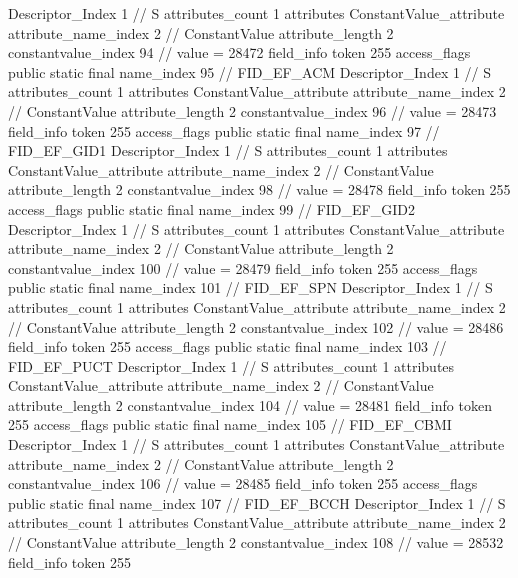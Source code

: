 {{{{{				Descriptor_Index	1		// S
				attributes_count	1
				attributes {
				ConstantValue_attribute {
					attribute_name_index	2		// ConstantValue
					attribute_length	2
					constantvalue_index	94		// value = 28472
				}
				}
			}
			field_info {
				token	255
				access_flags	public static final
				name_index	95		// FID_EF_ACM
				Descriptor_Index	1		// S
				attributes_count	1
				attributes {
				ConstantValue_attribute {
					attribute_name_index	2		// ConstantValue
					attribute_length	2
					constantvalue_index	96		// value = 28473
				}
				}
			}
			field_info {
				token	255
				access_flags	public static final
				name_index	97		// FID_EF_GID1
				Descriptor_Index	1		// S
				attributes_count	1
				attributes {
				ConstantValue_attribute {
					attribute_name_index	2		// ConstantValue
					attribute_length	2
					constantvalue_index	98		// value = 28478
				}
				}
			}
			field_info {
				token	255
				access_flags	public static final
				name_index	99		// FID_EF_GID2
				Descriptor_Index	1		// S
				attributes_count	1
				attributes {
				ConstantValue_attribute {
					attribute_name_index	2		// ConstantValue
					attribute_length	2
					constantvalue_index	100		// value = 28479
				}
				}
			}
			field_info {
				token	255
				access_flags	public static final
				name_index	101		// FID_EF_SPN
				Descriptor_Index	1		// S
				attributes_count	1
				attributes {
				ConstantValue_attribute {
					attribute_name_index	2		// ConstantValue
					attribute_length	2
					constantvalue_index	102		// value = 28486
				}
				}
			}
			field_info {
				token	255
				access_flags	public static final
				name_index	103		// FID_EF_PUCT
				Descriptor_Index	1		// S
				attributes_count	1
				attributes {
				ConstantValue_attribute {
					attribute_name_index	2		// ConstantValue
					attribute_length	2
					constantvalue_index	104		// value = 28481
				}
				}
			}
			field_info {
				token	255
				access_flags	public static final
				name_index	105		// FID_EF_CBMI
				Descriptor_Index	1		// S
				attributes_count	1
				attributes {
				ConstantValue_attribute {
					attribute_name_index	2		// ConstantValue
					attribute_length	2
					constantvalue_index	106		// value = 28485
				}
				}
			}
			field_info {
				token	255
				access_flags	public static final
				name_index	107		// FID_EF_BCCH
				Descriptor_Index	1		// S
				attributes_count	1
				attributes {
				ConstantValue_attribute {
					attribute_name_index	2		// ConstantValue
					attribute_length	2
					constantvalue_index	108		// value = 28532
				}
				}
			}
			field_info {
				token	255
}}}}}
